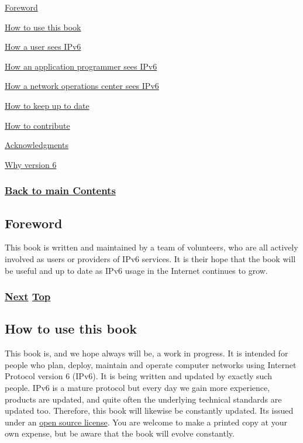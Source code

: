 \documentclass[
]{article}
\begin{document}
\hyperref[foreword]{Foreword}

\hyperref[how-to-use-this-book]{How to use this book}

\hyperref[how-a-user-sees-ipv6]{How a user sees IPv6}

\hyperref[how-an-application-programmer-sees-ipv6]{How an application
programmer sees IPv6}

\hyperref[how-a-network-operations-center-sees-ipv6]{How a network
operations center sees IPv6}

\hyperref[how-to-keep-up-to-date]{How to keep up to date}

\hyperref[how-to-contribute]{How to contribute}

\hyperref[acknowledgments]{Acknowledgments}

\hyperref[why-version-6]{Why version 6}

\subsubsection{\texorpdfstring{\hyperref[list-of-contents]{Back to main
Contents}}{Back to main Contents}}\label{back-to-main-contents}

\pagebreak

\subsection{Foreword}\label{foreword}

This book is written and maintained by a team of volunteers, who are all
actively involved as users or providers of IPv6 services. It is their
hope that the book will be useful and up to date as IPv6 usage in the
Internet continues to grow.

\subsubsection{\texorpdfstring{\hyperref[how-to-use-this-book]{Next}
\hyperref[introduction-and-foreword]{Top}}{Next Top}}\label{next-top}

\pagebreak

\subsection{How to use this book}\label{how-to-use-this-book}

This book is, and we hope always will be, a work in progress. It is
intended for people who plan, deploy, maintain and operate computer
networks using Internet Protocol version 6 (IPv6). It is being written
and updated by exactly such people. IPv6 is a mature protocol but every
day we gain more experience, products are updated, and quite often the
underlying technical standards are updated too. Therefore, this book
will likewise be constantly updated. It\textquotesingle s issued under
an \href{https://github.com/becarpenter/book6/blob/main/LICENSE.md}{open
source license}. You are welcome to make a printed copy at your own
expense, but be aware that the book will evolve constantly.
\end{document}
